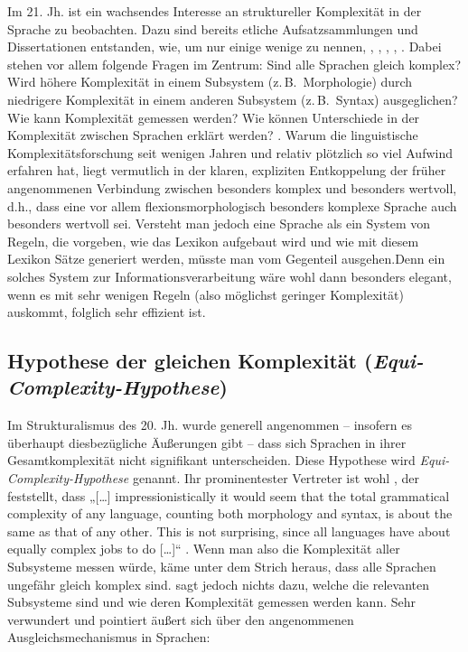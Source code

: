 Im 21. Jh. ist ein wachsendes Interesse an struktureller Komplexität in der Sprache zu beobachten. Dazu sind bereits etliche Aufsatzsammlungen und Dissertationen entstanden, wie, um nur einige wenige zu nennen, \citet{Kusters2003}, \citet{MiestamoSinnemäkiKarlsson2008}, \citet{SampsonGilTrudgill2009}, \citet{Sinnemäki2011}, \citet{SzmrecsanyiKortmann2012}. Dabei stehen vor allem folgende Fragen im Zentrum: Sind alle Sprachen gleich komplex? Wird höhere Komplexität in einem Subsystem (z.\,B.\ Morphologie) durch niedrigere Komplexität in einem anderen Subsystem (z.\,B.\ Syntax) ausgeglichen? Wie kann Komplexität gemessen werden? Wie können Unterschiede in der Komplexität zwischen Sprachen erklärt werden? \citep{BaechlerSeiler2016a}. Warum die linguistische Komplexitätsforschung seit wenigen Jahren und relativ plötzlich so viel Aufwind erfahren hat, liegt vermutlich in der klaren, expliziten Entkoppelung der früher angenommenen Verbindung zwischen besonders komplex und besonders wertvoll, d.h., dass eine vor allem flexionsmorphologisch besonders komplexe Sprache auch besonders wertvoll sei. Versteht man jedoch eine Sprache als ein System von Regeln, die vorgeben, wie das Lexikon aufgebaut wird und wie mit diesem Lexikon Sätze generiert werden, müsste man vom Gegenteil ausgehen.\largerpage[2] Denn ein solches System zur Informationsverarbeitung wäre wohl dann besonders elegant, wenn es mit sehr wenigen Regeln (also möglichst geringer Komplexität) auskommt, folglich sehr effizient ist.

\subsection{Hypothese der gleichen Komplexität (\textit{Equi-Complexity-Hypothese})}\label{2.1.2}

Im Strukturalismus des 20. Jh. wurde generell angenommen – insofern es überhaupt diesbezügliche Äußerungen gibt – dass sich Sprachen in ihrer Gesamtkomplexität nicht signifikant unterscheiden. Diese Hypothese wird \textit{Equi-Com\-ple\-xi\-ty-Hy\-po\-the\-se} genannt. Ihr prominentester Vertreter ist wohl \citet{Hockett1958}, der feststellt, dass „[…] impressionistically it would seem that the total grammatical complexity of any language, counting both morphology and syntax, is about the same as that of any other. This is not surprising, since all languages have about equally complex jobs to do […]“ \citep[180]{Hockett1958}. Wenn man also die Komplexität aller Subsysteme messen würde, käme unter dem Strich heraus, dass alle Sprachen ungefähr gleich komplex sind. \citet{Hockett1958} sagt jedoch nichts dazu, welche die relevanten Subsysteme sind und wie deren Komplexität gemessen werden kann. Sehr verwundert und pointiert äußert sich \citet{Sampson2009} über den angenommenen Ausgleichsmechanismus in Sprachen:

